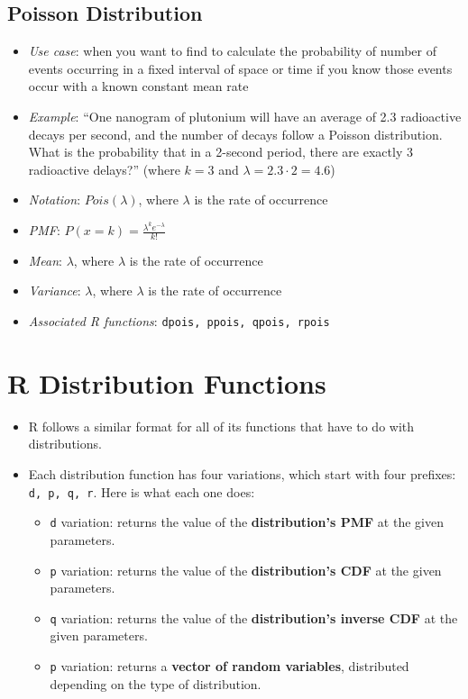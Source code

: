 \documentclass[12pt]{article}
\begin{document}
\subsection{Poisson Distribution}
\begin{itemize}
	\item \textit{Use case}: when you want to find to
	      calculate the probability of number of events
	      occurring in a fixed interval of space or time if you
	      know those events occur with a known constant mean
	      rate
	\item \textit{Example}: ``One nanogram of plutonium will
	      have an average of 2.3 radioactive decays per
	      second, and the number of decays follow a Poisson
	      distribution. What is the probability that in a
	      2-second period, there are exactly 3 radioactive
	      delays?'' (where $k=3$ and $\lambda = 2.3 \cdot 2 = 4.6$)
	\item \textit{Notation}: $Pois(\lambda)$, where
	      $\lambda$ is the rate of occurrence
	\item \textit{PMF}: $P(x = k) = \frac{\lambda^k
			      e^{-\lambda}}{k!}$
	\item \textit{Mean}: $\lambda$, where $\lambda$ is the rate of occurrence
	\item \textit{Variance}: $\lambda$, where $\lambda$ is the rate of occurrence
	\item \textit{Associated R functions}: \verb|dpois, ppois, qpois, rpois|
\end{itemize}

\section{R Distribution Functions}



\begin{itemize}
	\item  R follows a similar format for all of its functions that have to do with distributions.
	\item Each distribution function has four variations, which start with four prefixes: \verb|d, p, q, r|. Here is what each one does:
	      \begin{itemize}
		      \item \verb|d| variation: returns the value of the \textbf{distribution's PMF} at the given parameters.
		      \item \verb|p| variation: returns the value of the \textbf{distribution's CDF} at the given parameters.
		      \item \verb|q| variation: returns the value of the \textbf{distribution's inverse CDF} at the given parameters.
		      \item \verb|p| variation: returns a \textbf{vector of random variables}, distributed depending on the type of distribution.
	      \end{itemize}
\end{itemize}
\end{document}

